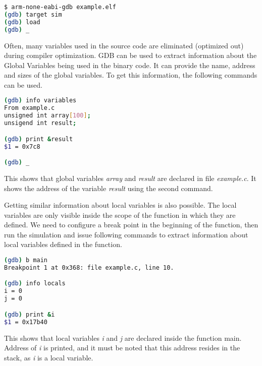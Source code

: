 \begin{lstlisting}[frame=none,numbers=none,language=bash]
$ arm-none-eabi-gdb example.elf
(gdb) target sim
(gdb) load
(gdb) _
\end{lstlisting}


Often, many variables used in the source code are eliminated (optimized out) during compiler optimization. GDB can be used to extract information about the Global Variables being used in the binary code. It can provide the name, address and sizes of the global variables. To get this information, the following commands can be used.

\begin{lstlisting}[frame=none,numbers=none,language=bash]
(gdb) info variables
From example.c
unsigned int array[100];
unsigend int result;

(gdb) print &result
$1 = 0x7c8

(gdb) _ 
\end{lstlisting}

This shows that global variables \textit{array} and \textit{result} are declared in file \textit{example.c}. It shows the address of the variable \textit{result} using the second command.

Getting similar information about local variables is also possible. The local variables are only visible inside the scope of the function in which they are defined. We need to configure a break point in the beginning of the function, then run the simulation and issue following commands to extract information about local variables defined in the function.

\begin{lstlisting}[frame=none,numbers=none,language=bash]
(gdb) b main
Breakpoint 1 at 0x368: file example.c, line 10.

(gdb) info locals
i = 0
j = 0

(gdb) print &i
$1 = 0x17b40
\end{lstlisting}

This shows that local variables \textit{i} and \textit{j} are declared inside the function main. Address of \textit{i} is printed, and it must be noted that this address resides in the stack, as \textit{i} is a local variable.